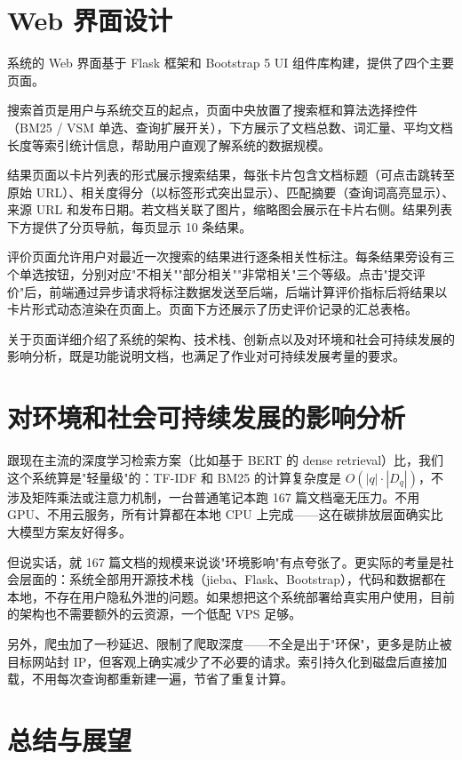 \documentclass[12pt, a4paper]{ctexart}
\begin{document}
\section{Web 界面设计}

系统的 Web 界面基于 Flask 框架和 Bootstrap 5 UI 组件库构建，提供了四个主要页面。

搜索首页是用户与系统交互的起点，页面中央放置了搜索框和算法选择控件（BM25 / VSM 单选、查询扩展开关），下方展示了文档总数、词汇量、平均文档长度等索引统计信息，帮助用户直观了解系统的数据规模。

结果页面以卡片列表的形式展示搜索结果，每张卡片包含文档标题（可点击跳转至原始 URL）、相关度得分（以标签形式突出显示）、匹配摘要（查询词高亮显示）、来源 URL 和发布日期。若文档关联了图片，缩略图会展示在卡片右侧。结果列表下方提供了分页导航，每页显示 10 条结果。

评价页面允许用户对最近一次搜索的结果进行逐条相关性标注。每条结果旁设有三个单选按钮，分别对应"不相关""部分相关""非常相关"三个等级。点击"提交评价"后，前端通过异步请求将标注数据发送至后端，后端计算评价指标后将结果以卡片形式动态渲染在页面上。页面下方还展示了历史评价记录的汇总表格。

关于页面详细介绍了系统的架构、技术栈、创新点以及对环境和社会可持续发展的影响分析，既是功能说明文档，也满足了作业对可持续发展考量的要求。


\section{对环境和社会可持续发展的影响分析}

跟现在主流的深度学习检索方案（比如基于 BERT 的 dense retrieval）比，我们这个系统算是"轻量级"的：TF-IDF 和 BM25 的计算复杂度是 $O(|q| \cdot |D_q|)$，不涉及矩阵乘法或注意力机制，一台普通笔记本跑 167 篇文档毫无压力。不用 GPU、不用云服务，所有计算都在本地 CPU 上完成——这在碳排放层面确实比大模型方案友好得多。

但说实话，就 167 篇文档的规模来说谈"环境影响"有点夸张了。更实际的考量是社会层面的：系统全部用开源技术栈（jieba、Flask、Bootstrap），代码和数据都在本地，不存在用户隐私外泄的问题。如果想把这个系统部署给真实用户使用，目前的架构也不需要额外的云资源，一个低配 VPS 足够。

另外，爬虫加了一秒延迟、限制了爬取深度——不全是出于"环保"，更多是防止被目标网站封 IP，但客观上确实减少了不必要的请求。索引持久化到磁盘后直接加载，不用每次查询都重新建一遍，节省了重复计算。


\section{总结与展望}
\end{document}
